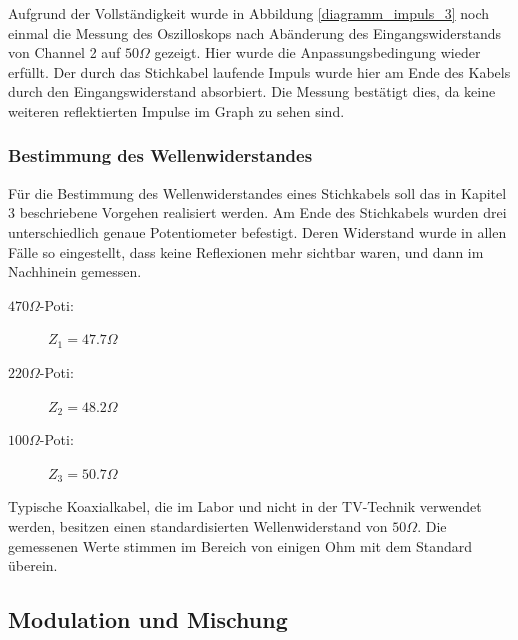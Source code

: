 		Aufgrund der Vollständigkeit wurde in Abbildung \ref{diagramm_impuls_3} noch einmal die Messung des Oszilloskops nach Abänderung des Eingangswiderstands von Channel 2 auf $50\Omega$ gezeigt.
		Hier wurde die Anpassungsbedingung wieder erfüllt.
		Der durch das Stichkabel laufende Impuls wurde hier am Ende des Kabels durch den Eingangswiderstand absorbiert.
		Die Messung bestätigt dies, da keine weiteren reflektierten Impulse im Graph zu sehen sind.


	\subsubsection{Bestimmung des Wellenwiderstandes} %
	\label{ssub:bestimmung_des_wellenwiderstandes}
	
		Für die Bestimmung des Wellenwiderstandes eines Stichkabels soll das in Kapitel 3 beschriebene Vorgehen realisiert werden.
		Am Ende des Stichkabels wurden drei unterschiedlich genaue Potentiometer befestigt.
		Deren Widerstand wurde in allen Fälle so eingestellt, dass keine Reflexionen mehr sichtbar waren, und dann im Nachhinein gemessen.

		\begin{description}
			\item[$470\Omega$-Poti:]
				\centering $Z_1 = 47.7\Omega$
			\item[$220\Omega$-Poti:]
				$Z_2 = 48.2\Omega$
			\item[$100\Omega$-Poti:]
				$Z_3 = 50.7\Omega$
		\end{description}

		Typische Koaxialkabel, die im Labor und nicht in der TV-Technik verwendet werden, besitzen einen standardisierten Wellenwiderstand von $50\Omega$. \cite{wikikoax}
		Die gemessenen Werte stimmen im Bereich von einigen Ohm mit dem Standard überein.



\subsection{Modulation und Mischung} %
\label{sub:modulation_und_mischung}

